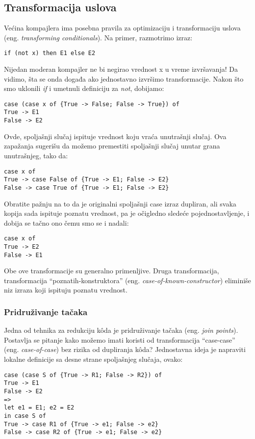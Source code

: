 \subsection {Transformacija uslova}
\label{sec:podnaslovTransformation}

Većina kompajlera ima posebna pravila za optimizaciju i transformaciju uslova (eng. \emph{transforming conditionals}). Na primer, razmotrimo izraz:
\begin{verbatim}
if (not x) then E1 else E2
\end{verbatim}
Nijedan moderan kompajler ne bi negirao vrednost x u vreme izvršavanja! Da vidimo, šta se onda događa ako jednostavno 
izvršimo transformacije. Nakon što smo uklonili \textit{if} i umetnuli definiciju za \textit{not}, dobijamo:
\begin{verbatim}
case (case x of {True -> False; False -> True}) of
True -> E1
False -> E2
\end{verbatim}
Ovde, spoljašnji slučaj ispituje vrednost koju vraća unutrašnji slučaj. Ova zapažanja sugerišu da možemo premestiti spoljašnji slučaj 
unutar grana unutrašnjeg, tako da:
\begin{verbatim}
case x of
True -> case False of {True -> E1; False -> E2}
False -> case True of {True -> E1; False -> E2}
\end{verbatim}

Obratite pažnju na to da je originalni spoljašnji case izraz dupliran, ali svaka kopija sada ispituje poznatu vrednost, pa je 
očigledno sledeće pojednostavljenje, i dobija se tačno ono čemu smo se i nadali:
\begin{verbatim}
case x of
True -> E2
False -> E1
\end{verbatim}

Obe ove transformacije su generalno primenljive. Druga transformacija, transformacija “poznatih-konstruktora” (eng. \emph{case-of-known-constructor}) eliminiše niz izraza koji ispituju poznatu vrednost.

\subsubsection {Pridruživanje tačaka}
\label{sec:podpodnaslovJoin}

Jedna od tehnika za redukciju k\^{o}da je pridruživanje tačaka (eng. \emph{join points}). Postavlja se pitanje kako možemo imati koristi od transformacija “case-case” (eng. \emph{case-of-case}) bez rizika od dupliranja k\^{o}da? Jednostavna ideja je napraviti lokalne definicije sa desne strane spoljašnjeg slučaja, ovako:
\begin{verbatim}
case (case S of {True -> R1; False -> R2}) of
True -> E1
False -> E2
=>
let e1 = E1; e2 = E2
in case S of
True -> case R1 of {True -> e1; False -> e2}
False -> case R2 of {True -> e1; False -> e2}
\end{verbatim}

